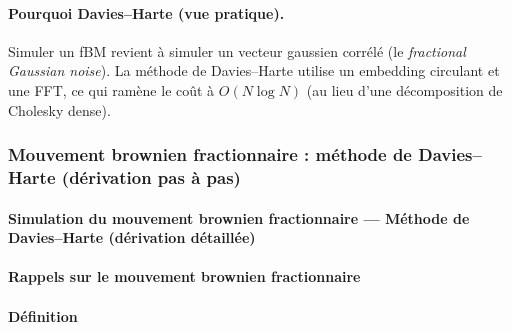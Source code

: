 \documentclass[11pt,a4paper]{article}
\newcommand{\1}{\mathbf{1}}
\begin{document}
\paragraph{Pourquoi Davies--Harte (vue pratique).}
Simuler un fBM revient \`a simuler un vecteur gaussien corr\'el\'e (le \emph{fractional Gaussian noise}).
La m\'ethode de Davies--Harte utilise un embedding circulant et une FFT, ce qui ram\`ene le co\^ut \`a $O(N\log N)$ (au lieu d'une d\'ecomposition de Cholesky dense).


\begingroup
\let\section\subsubsection
\let\subsection\paragraph
\section{Mouvement brownien fractionnaire : m\'ethode de Davies--Harte (d\'erivation pas \`a pas)}
\label{sec:deriv-fbm}

\subsection*{Simulation du mouvement brownien fractionnaire --- Méthode de Davies--Harte (dérivation détaillée)}

\subsection{Rappels sur le mouvement brownien fractionnaire}

\subsection{Définition}
\end{document}
